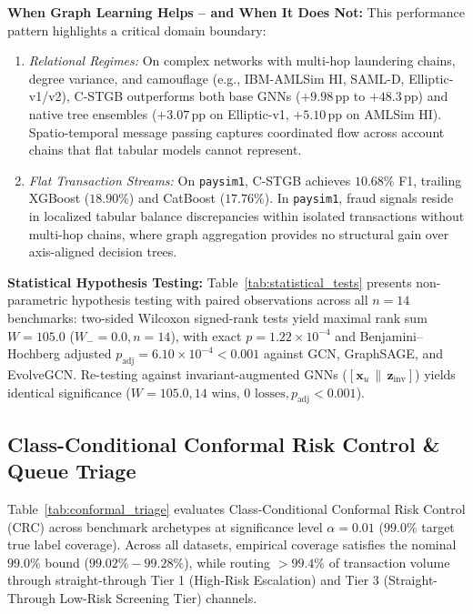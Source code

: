 \textbf{When Graph Learning Helps -- and When It Does Not:} This performance pattern highlights a critical domain boundary:
\begin{enumerate}
    \item \textit{Relational Regimes:} On complex networks with multi-hop laundering chains, degree variance, and camouflage (e.g., IBM-AMLSim HI, SAML-D, Elliptic-v1/v2), C-STGB outperforms both base GNNs ($+9.98$\,pp to $+48.3$\,pp) and native tree ensembles ($+3.07$\,pp on Elliptic-v1, $+5.10$\,pp on AMLSim HI). Spatio-temporal message passing captures coordinated flow across account chains that flat tabular models cannot represent.
    \item \textit{Flat Transaction Streams:} On \texttt{paysim1}, C-STGB achieves $10.68\%$ F1, trailing XGBoost ($18.90\%$) and CatBoost ($17.76\%$). In \texttt{paysim1}, fraud signals reside in localized tabular balance discrepancies within isolated transactions without multi-hop chains, where graph aggregation provides no structural gain over axis-aligned decision trees.
\end{enumerate}

\textbf{Statistical Hypothesis Testing:} Table~\ref{tab:statistical_tests} presents non-parametric hypothesis testing with paired observations across all $n=14$ benchmarks: two-sided Wilcoxon signed-rank tests yield maximal rank sum $W = 105.0$ ($W_- = 0.0, n=14$), with exact $p = 1.22 \times 10^{-4}$ and Benjamini--Hochberg adjusted $p_{\text{adj}} = 6.10 \times 10^{-4} < 0.001$ against GCN, GraphSAGE, and EvolveGCN. Re-testing against invariant-augmented GNNs ($[\mathbf{x}_u \,\|\, \mathbf{z}_{\text{inv}}]$) yields identical significance ($W=105.0, 14\text{ wins, } 0\text{ losses}, p_{\text{adj}} < 0.001$).




\subsection{Class-Conditional Conformal Risk Control \& Queue Triage}
\label{sec:crc_results}
Table~\ref{tab:conformal_triage} evaluates Class-Conditional Conformal Risk Control (CRC) across benchmark archetypes at significance level $\alpha = 0.01$ ($99.0\%$ target true label coverage). Across all datasets, empirical coverage satisfies the nominal $99.0\%$ bound ($99.02\% - 99.28\%$), while routing $>99.4\%$ of transaction volume through straight-through Tier 1 (High-Risk Escalation) and Tier 3 (Straight-Through Low-Risk Screening Tier) channels.

